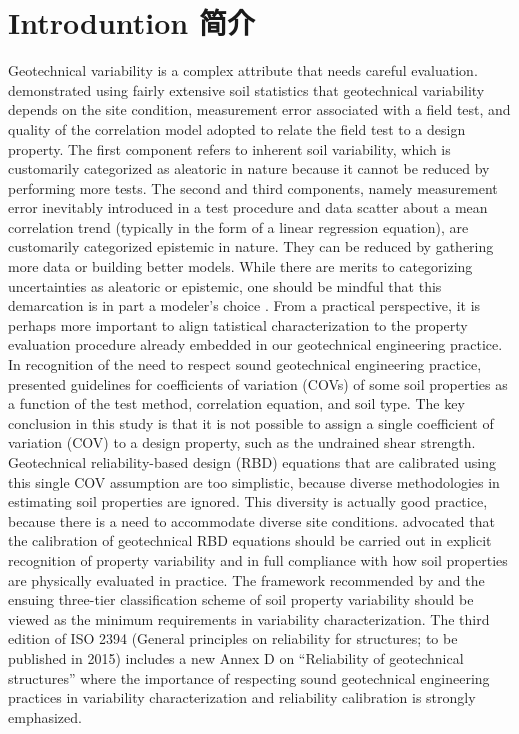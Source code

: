 \section{Introduntion 简介}

\begin{paracol}{2}

    Geotechnical variability is a complex attribute that needs careful evaluation. \citet{Phoon1999612} demonstrated using fairly extensive soil statistics that geotechnical variability depends on the site condition, measurement error associated with a field test, and quality of the correlation model adopted to relate the field test to a design property. The first component refers to inherent soil variability, which is customarily categorized as aleatoric in nature because it cannot be reduced by performing more tests. The second and third components, namely measurement error inevitably introduced in a test procedure and data scatter about a mean correlation trend (typically in the form of a linear regression equation), are customarily categorized epistemic in nature. They can be reduced by gathering more data or building better models. While there are merits to categorizing uncertainties as aleatoric or epistemic, one should be mindful that this demarcation is in part a modeler’s choice \citep{DerKiureghian2007}. From a practical perspective, it is perhaps more important to align tatistical characterization to the property evaluation procedure already embedded in our geotechnical engineering practice. In recognition of the need to respect sound geotechnical engineering practice, \citet{Phoon1999625} presented guidelines for coefficients of variation (COVs) of some soil properties as a function of the test method, correlation equation, and soil type. The key conclusion in this study is that it is not possible to assign a single coefficient of variation (COV) to a design property, such as the undrained shear strength. Geotechnical reliability-based design (RBD) equations that are calibrated using this single COV assumption are too simplistic, because diverse methodologies in estimating soil properties are ignored. This diversity is actually good practice, because there is a need to accommodate diverse site conditions. \citet{Phoon1999612,Phoon1999625} advocated that the calibration of geotechnical RBD equations should be carried out in explicit recognition of property variability and in full compliance with how soil properties are physically evaluated in practice. The framework recommended by \citet{Phoon1999612,Phoon1999625} and the ensuing three-tier classification scheme of soil property variability \citep{Phoon2008344} should be viewed as the minimum requirements in variability characterization. The third edition of ISO 2394 (General principles on reliability for structures; to be published in 2015) includes a new Annex D on “Reliability of geotechnical structures” where the importance of respecting sound geotechnical engineering practices in variability characterization and reliability calibration is strongly emphasized.


\end{paracol}
